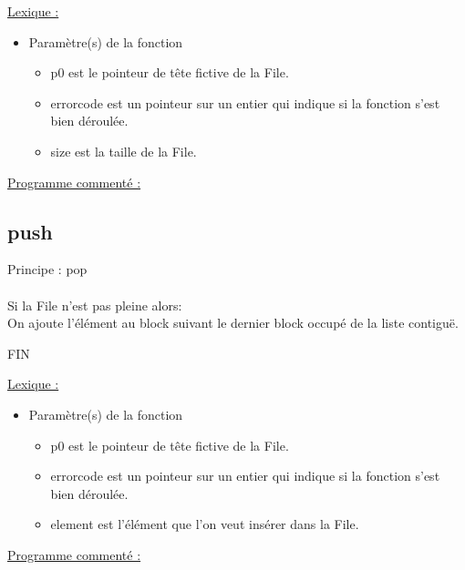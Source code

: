 \documentclass[a4paper]{article}
\newcommand\tab[1][1cm]{\hspace*{#1}}
\begin{document}
\underline{Lexique :}

\begin{itemize}

\item Paramètre(s) de la fonction  

\begin{itemize}

\item p0 est le pointeur de tête fictive de la File.

\item errorcode est un pointeur sur un entier qui indique si la fonction s'est bien déroulée.

\item size est la taille de la File.

\end{itemize}

\end{itemize}
\underline{Programme commenté :}
\subsection{push}

\begin{algorithm}

Principe : pop
\\
\\
\tab Si la File n'est pas pleine alors:
\\
\tab \tab On ajoute l'élément au block suivant le dernier block occupé de la liste contiguë.

FIN

\end{algorithm}


\underline{Lexique :}

\begin{itemize}

\item Paramètre(s) de la fonction  

\begin{itemize}

\item p0 est le pointeur de tête fictive de la File.

\item errorcode est un pointeur sur un entier qui indique si la fonction s'est bien déroulée.

\item element est l'élément que l'on veut insérer dans la File.

\end{itemize}
\end{itemize}
\underline{Programme commenté :}
\end{document}
